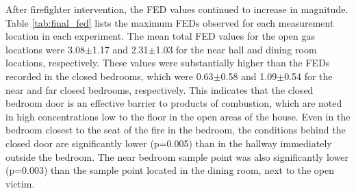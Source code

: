 \documentclass[12pt,oneside]{article}
\begin{document}
After firefighter intervention, the FED values continued to increase in magnitude. Table \ref{tab:final_fed} lists the maximum FEDs observed for each measurement location in each experiment. The mean total FED values for the open gas locations were 3.08$\pm$1.17 and 2.31$\pm$1.03 for the near hall and dining room locations, respectively. These values were substantially higher than the FEDs recorded in the closed bedrooms, which were 0.63$\pm$0.58 and 1.09$\pm$0.54 for the near and far closed bedrooms, respectively. This indicates that the closed bedroom door is an effective barrier to products of combustion, which are noted in high concentrations low to the floor in the open areas of the house. Even in the bedroom closest to the seat of the fire in the bedroom, the conditions behind the closed door are significantly lower (p=0.005) than in the hallway immediately outside the bedroom. The near bedroom sample point was also significantly lower (p=0.003) than the sample point located in the dining room, next to the open victim.

\end{document}
